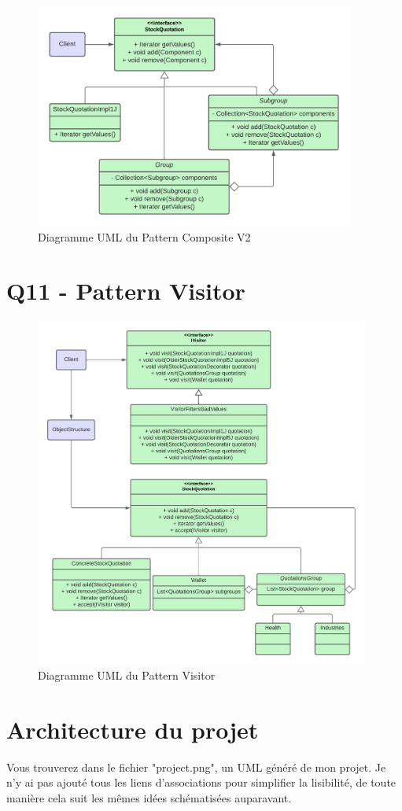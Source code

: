 \documentclass{article}
\begin{document}
\begin{figure}[!htb]
    \centering
    \includegraphics[width=10.5cm]{umls/compv2.png}
    \caption{Diagramme UML du Pattern Composite V2}
    \label{fig:comp2}
\end{figure}

\section{Q11 - Pattern Visitor}

\begin{figure}[!htb]
    \centering
    \includegraphics[width=11cm]{umls/visitor.png}
    \caption{Diagramme UML du Pattern Visitor}
    \label{fig:vis1}
\end{figure}

\section{Architecture du projet}

Vous trouverez dans le fichier "project.png", un UML généré de mon projet. Je n'y ai pas ajouté tous les liens d'associations pour simplifier la lisibilité, de toute manière cela suit les mêmes idées schématisées auparavant.
\end{document}
